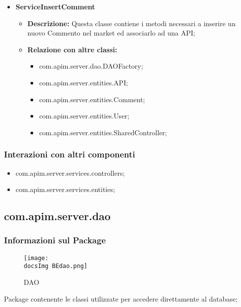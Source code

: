 {{{{\begin{itemize}
\begin{itemize}
            \item \textbf{Relazione con altre classi:}
            \begin{itemize}
              \item com.apim.server.dao.DAOFactory;
              \item com.apim.server.entities.API;
              \item com.apim.server.entities.SharedController;
            \end{itemize}
          \end{itemize}
          \item \textbf{ServiceInsertComment}
          \begin{itemize}
            \item \textbf{Descrizione:} Questa classe contiene i metodi necessari a inserire un nuovo Commento nel market ed associarlo ad una API;
            \item \textbf{Relazione con altre classi:}
            \begin{itemize}
              \item com.apim.server.dao.DAOFactory;
              \item com.apim.server.entities.API;
              \item com.apim.server.entities.Comment;
              \item com.apim.server.entities.User;
              \item com.apim.server.entities.SharedController;
            \end{itemize}
          \end{itemize}
       \end{itemize}
       \subsubsection{Interazioni con altri componenti}
          \begin{itemize}
            \item com.apim.server.services.controllers;
            \item com.apim.server.services.entities;
          \end{itemize}
          
          
          \subsection{com.apim.server.dao}{
    \subsubsection{Informazioni sul Package}
        \begin{figure}[H]
          \centering
         \texttt{[image: \\docsImg BEdao.png]}
          \caption{DAO}
          \label{DAO}
        \end{figure}
       Package  contenente le classi utilizzate per accedere direttamente al database;
}}}}}
